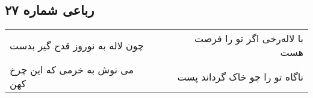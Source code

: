 \begin{center}
\section*{رباعی شماره ۲۷}
\label{sec:sh027}
\begin{longtable}{l p{0.5cm} r}
چون لاله به نوروز قدح گیر بدست
&&
با لاله‌رخی اگر تو را فرصت هست
\\
می نوش به خرمی که این چرخ کهن
&&
ناگاه تو را چو خاک گرداند پست
\\
\end{longtable}
\end{center}
